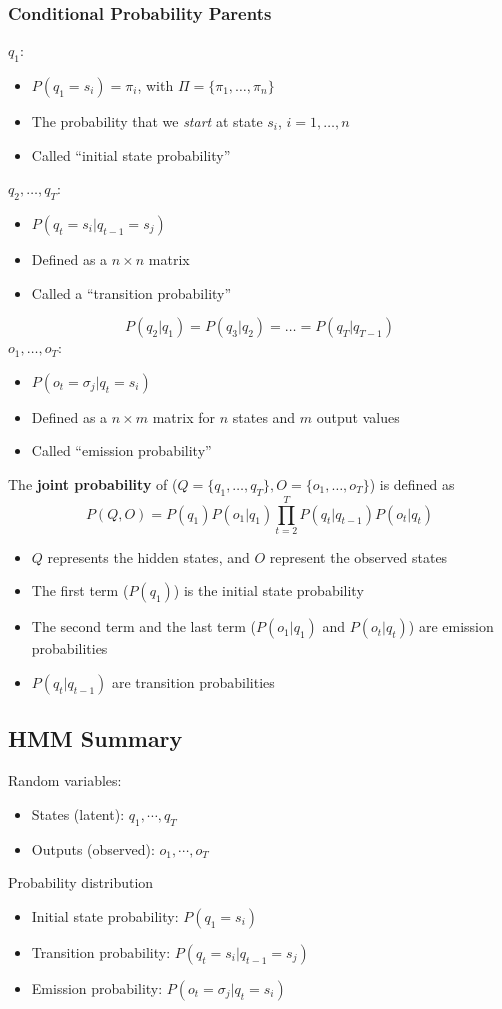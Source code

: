 \documentclass[10pt]{article}
\begin{document}
\subsubsection*{Conditional Probability Parents}
$q_1$:
\begin{itemize}
	\item $P(q_1 = s_i) = \pi_i$, with $\Pi = \{\pi_1, \dots, \pi_n\}$
	\item The probability that we \textit{start} at state $s_i$, $i = 1, \dots, n$
	\item Called ``initial state probability''
\end{itemize}
$q_2, \dots, q_T$:
\begin{itemize}
	\item $P(q_t = s_i | q_{t - 1} = s_j)$
	\item Defined as a $n \times n$ matrix
	\item Called a ``transition probability''
\end{itemize}
\[P(q_2 | q_1) = P(q_3 | q_2) = \dots = P(q_T | q_{T - 1})\]
$o_1, \dots, o_T$:
\begin{itemize}
	\item $P(o_t = \sigma_j | q_t = s_i)$
	\item Defined as a $n \times m$ matrix for $n$ states and $m$ output values
	\item Called ``emission probability''
\end{itemize}
The \textbf{joint probability} of ($Q = \{q_1, \dots, q_T\}, O = \{o_1, \dots, o_T\}$) is defined as
\[P(Q, O) = P(q_1) P(o_1 | q_1) \prod_{t = 2}^T P(q_t | q_{t - 1}) P(o_t | q_t)\]
\begin{itemize}
	\item $Q$ represents the hidden states, and $O$ represent the observed states
    \item The first term ($P(q_1)$) is the initial state probability
	\item The second term and the last term ($P(o_1 | q_1)$ and $P(o_t | q_t)$) are emission probabilities
	\item $P(q_t | q_{t - 1})$ are transition probabilities
\end{itemize}

\subsection*{HMM Summary}
Random variables:
\begin{itemize}
	\item States (latent): $q_1, \cdots, q_T$
	\item Outputs (observed): $o_1, \cdots, o_T$
\end{itemize}
Probability distribution
\begin{itemize}
	\item Initial state probability: $P(q_1 = s_i)$
	\item Transition probability: $P(q_t = s_i | q_{t - 1} = s_j)$
	\item Emission probability: $P(o_t = \sigma_j | q_t = s_i)$
\end{itemize}
\end{document}
